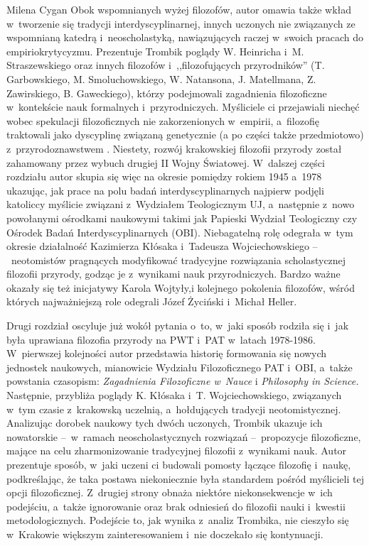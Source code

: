 \begin{newrevplenv}{Milena Cygan}
Obok wspomnianych wyżej filozofów, autor omawia także wkład w~tworzenie się tradycji interdyscyplinarnej, innych uczonych nie związanych ze wspomnianą katedrą i~neoscholastyką, nawiązujących raczej w~swoich pracach do empiriokrytycyzmu. Prezentuje Trombik poglądy W. Heinricha i~M. Straszewskiego oraz innych filozofów i~,,filozofujących przyrodników'' (T. Garbowskiego, M. Smoluchowskiego, W. Natansona, J. Matellmana, Z. Zawirskiego, B. Gaweckiego), którzy podejmowali zagadnienia filozoficzne w~kontekście nauk formalnych i~przyrodniczych. Myśliciele ci przejawiali niechęć wobec spekulacji filozoficznych nie zakorzenionych w~empirii, a~filozofię traktowali jako dyscyplinę związaną genetycznie (a po części także przedmiotowo) z~przyrodoznawstwem
\parencite[][s.~86]{trombik_koncepcje_2021}. %
 Niestety, rozwój krakowskiej filozofii przyrody został zahamowany przez wybuch drugiej II Wojny Światowej. W~dalszej części rozdziału autor skupia się więc na okresie pomiędzy rokiem 1945 a~1978 ukazując, jak prace na polu badań interdyscyplinarnych najpierw podjęli katoliccy myślicie związani z~Wydziałem Teologicznym UJ, a~następnie z~nowo powołanymi ośrodkami naukowymi takimi jak Papieski Wydział Teologiczny czy Ośrodek Badań Interdyscyplinarnych (OBI). Niebagatelną rolę odegrała w~tym okresie działalność Kazimierza Kłósaka i~Tadeusza Wojciechowskiego --~neotomistów pragnących modyfikować tradycyjne rozwiązania scholastycznej filozofii przyrody, godząc je z~wynikami nauk przyrodniczych. Bardzo ważne okazały się też inicjatywy Karola Wojtyły,i kolejnego pokolenia filozofów, wśród których najważniejszą role odegrali Józef Życiński i~Michał Heller.

Drugi rozdział oscyluje już wokół pytania o~to, w~jaki sposób rodziła się i~jak była uprawiana filozofia przyrody na PWT i~PAT w~latach 1978-1986. W~pierwszej kolejności autor przedstawia historię formowania się nowych jednostek naukowych, mianowicie Wydziału Filozoficznego PAT i~OBI, a~także powstania czasopism: \textit{Zagadnienia Filozoficzne w~Nauce} i \textit{Philosophy in Science.} Następnie, przybliża poglądy K. Kłósaka i~T. Wojciechowskiego, związanych w~tym czasie z~krakowską uczelnią, a~hołdujących tradycji neotomistycznej. Analizując dorobek naukowy tych dwóch uczonych, Trombik ukazuje ich nowatorskie --~w~ramach neoscholastycznych rozwiązań --~propozycje filozoficzne, mające na celu zharmonizowanie tradycyjnej filozofii z~wynikami nauk. Autor prezentuje sposób, w~jaki uczeni ci budowali pomosty łączące filozofię i~naukę, podkreślając, że taka postawa niekoniecznie była standardem pośród myślicieli tej opcji filozoficznej. Z~drugiej strony obnaża niektóre niekonsekwencje w~ich podejściu, a~także ignorowanie oraz brak odniesień do filozofii nauki i~kwestii metodologicznych. Podejście to, jak wynika z~analiz Trombika, nie cieszyło się w~Krakowie większym zainteresowaniem i~nie doczekało się kontynuacji.


\end{newrevplenv}
